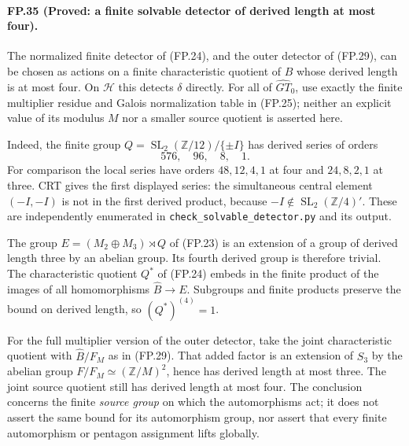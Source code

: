 \paragraph{FP.35 (Proved: a finite solvable detector of derived length at most four).}
The normalized finite detector of (FP.24), and the outer detector
of (FP.29), can be chosen as actions on a finite characteristic
quotient of $\widehat B$ whose derived length is at most four.
On $\mathcal H$ this detects $\delta$ directly. For all of
$\widehat{GT}_0$, use exactly the finite multiplier residue and
Galois normalization table in (FP.25); neither an explicit value
of its modulus $M$ nor a smaller source quotient is asserted here.

Indeed, the finite group
$Q=\operatorname{SL}_2(\mathbb Z/12)/\{\pm I\}$ has derived
series of orders
\[
                     576,\quad96,\quad8,\quad1.
\]
For comparison the local series have orders
$48,12,4,1$ at four and $24,8,2,1$ at three. CRT gives the
first displayed series: the simultaneous central element
$(-I,-I)$ is not in the first derived product, because
$-I\notin\operatorname{SL}_2(\mathbb Z/4)'$.
These are independently enumerated in
\texttt{check\_solvable\_detector.py} and its output.

The group $E=(M_2\oplus M_3)\rtimes Q$ of (FP.23) is an
extension of a group of derived length three by an abelian group.
Its fourth derived group is therefore trivial. The characteristic
quotient $Q^*$ of (FP.24) embeds in the finite product of the
images of all homomorphisms $\widehat B\to E$. Subgroups and
finite products preserve the bound on derived length, so
$(Q^*)^{(4)}=1$.

For the full multiplier version of the outer detector, take the
joint characteristic quotient with $\widehat B/F_M$ as in
(FP.29). That added factor is an extension of $S_3$ by the
abelian group $F/F_M\simeq(\mathbb Z/M)^2$, hence has derived
length at most three. The joint source quotient still has derived
length at most four. The conclusion concerns the finite
\emph{source group} on which the automorphisms act; it does not
assert the same bound for its automorphism group, nor assert that
every finite automorphism or pentagon assignment lifts globally.

